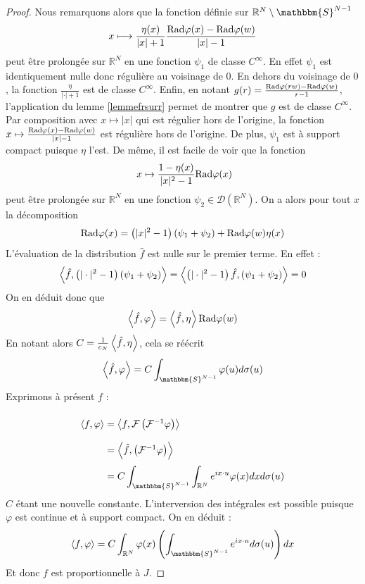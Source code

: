 \documentclass[11pt,a4paper]{article}
\begin{document}
\begin{The}
\begin{proof}
Nous remarquons alors que la fonction définie sur $\mathbb{R}^N \setminus \mathbbm{S}^{N-1}$ \[x\longmapsto \frac{\eta(x)}{|x|+1}\frac{\textup{Rad}\varphi(x) - \textup{Rad}\varphi(w)}{|x| - 1}\] peut être prolongée sur $\mathbb{R}^N$ en une fonction $\psi_1$ de classe $C^\infty$. En effet $\psi_1$ est identiquement nulle donc régulière au voisinage de $0$. En dehors du voisinage de $0$, la fonction $\frac{\eta}{|\cdot|+1}$ est de classe $C^\infty$. Enfin, en notant $g(r) =\frac{\textup{Rad}\varphi(rw) - \textup{Rad}\varphi(w)}{r - 1}$, l'application du lemme \ref{lemmefrsurr} permet de montrer que $g$ est de classe $C^\infty$. Par composition avec $x \mapsto |x|$ qui est régulier hors de l'origine, la fonction $x\mapsto\frac{\textup{Rad}\varphi(x) - \textup{Rad}\varphi(w)}{|x| - 1}$ est régulière hors de l'origine. De plus, $\psi_1$ est à support compact puisque $\eta$ l'est. De même, il est facile de voir que la fonction \[\ x \mapsto \frac{1-\eta(x)}{|x|^2 - 1}\textup{Rad}\varphi(x)\] peut être prolongée sur $\mathbb{R}^N$ en une fonction $\psi_2 \in \mathcal{D}(\mathbb{R}^N)$. On a alors pour tout $x$ la décomposition \[\textup{Rad}\varphi(x) = \left(|x|^2 - 1\right)(\psi_1 + \psi_2) + \textup{Rad}\varphi(w)\eta(x)\] L'évaluation de la distribution $\hat{f}$ est nulle sur le  premier terme. En effet : \[\left\langle \hat{f},\left(|\cdot|^2-1\right)\left(\psi_1 + \psi_2\right)\right\rangle = \left\langle \left(|\cdot|^2-1\right)\hat{f},\left(\psi_1 + \psi_2\right)\right\rangle = 0 \] On en déduit donc que \[\left\langle \hat{f},\varphi\right\rangle = \left\langle \hat{f},\eta\right\rangle\textup{Rad}\varphi(w)\] En notant alors $C = \frac{1}{c_N}\left\langle \hat{f},\eta\right\rangle$, cela se réécrit \[\duality{\hat{f}}{\varphi} = C \int_{\mathbbm{S}^{N-1}}{\varphi(u)d\sigma(u)}\] 
Exprimons à présent $f$ : 
\[\arraycolsep=1.4pt\def\arraystretch{2.2}
\begin{array}{ll}
\duality{f}{\varphi} &= \duality{f}{\mathcal{F}\left(\mathcal{F}^{-1}\varphi\right)}\\
&= \duality{\hat{f}}{\left(\mathcal{F}^{-1}\varphi\right)}\\
&= \displaystyle C\int_{\mathbbm{S}^{N-1}}\int_{\mathbb{R}^N}e^{ix \cdot u}\varphi(x)dxd\sigma(u)
\end{array}
\]
$C$ étant une nouvelle constante. L'interversion des intégrales est possible puisque $\varphi$ est continue et à support compact. On en déduit :  \[\duality{f}{\varphi} = C\int_{\mathbb{R}^N}\varphi(x) \left( \int_{\mathbbm{S}^{N-1}}e^{ix\cdot u}d\sigma(u)\right) dx\]
Et donc $f$ est proportionnelle à $J$. 
\end{proof}
\end{The}
\end{document}
